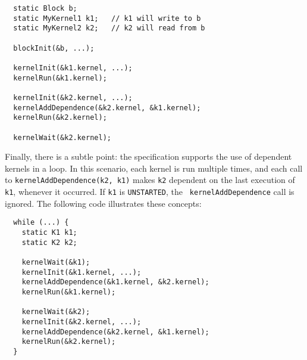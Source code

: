 {\small
\begin{verbatim}
  static Block b;
  static MyKernel1 k1;   // k1 will write to b
  static MyKernel2 k2;   // k2 will read from b

  blockInit(&b, ...);

  kernelInit(&k1.kernel, ...);  
  kernelRun(&k1.kernel);

  kernelInit(&k2.kernel, ...);
  kernelAddDependence(&k2.kernel, &k1.kernel);
  kernelRun(&k2.kernel);

  kernelWait(&k2.kernel);
\end{verbatim}}

Finally, there is a subtle point: the specification supports the use
of dependent kernels in a loop.  In this scenario, each kernel is run
multiple times, and each call to {\tt kernelAddDependence(k2, k1)}
makes {\tt k2} dependent on the last execution of {\tt k1}, whenever
it occurred. If {\tt k1} is {\tt UNSTARTED}, the {\tt
kernelAddDependence} call is ignored. The following code illustrates
these concepts:

{\small
\begin{verbatim}
  while (...) {
    static K1 k1;
    static K2 k2;

    kernelWait(&k1);
    kernelInit(&k1.kernel, ...);
    kernelAddDependence(&k1.kernel, &k2.kernel);
    kernelRun(&k1.kernel);

    kernelWait(&k2);
    kernelInit(&k2.kernel, ...);
    kernelAddDependence(&k2.kernel, &k1.kernel);
    kernelRun(&k2.kernel);
  }
\end{verbatim}}

